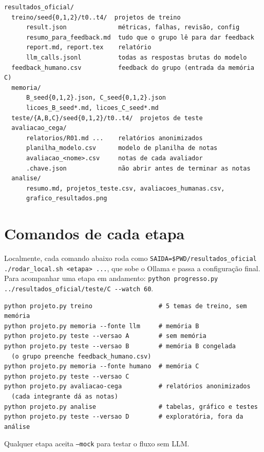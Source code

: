 \documentclass[11pt,a4paper]{article}
\begin{document}
\begin{verbatim}
resultados_oficial/
  treino/seed{0,1,2}/t0..t4/  projetos de treino
      result.json              métricas, falhas, revisão, config
      resumo_para_feedback.md  tudo que o grupo lê para dar feedback
      report.md, report.tex    relatório
      llm_calls.jsonl          todas as respostas brutas do modelo
  feedback_humano.csv          feedback do grupo (entrada da memória C)
  memoria/
      B_seed{0,1,2}.json, C_seed{0,1,2}.json
      licoes_B_seed*.md, licoes_C_seed*.md
  teste/{A,B,C}/seed{0,1,2}/t0..t4/  projetos de teste
  avaliacao_cega/
      relatorios/R01.md ...    relatórios anonimizados
      planilha_modelo.csv      modelo de planilha de notas
      avaliacao_<nome>.csv     notas de cada avaliador
      .chave.json              não abrir antes de terminar as notas
  analise/
      resumo.md, projetos_teste.csv, avaliacoes_humanas.csv,
      grafico_resultados.png
\end{verbatim}

\section{Comandos de cada etapa}

Localmente, cada comando abaixo roda como
\verb|SAIDA=$PWD/resultados_oficial ./rodar_local.sh <etapa> ...|, que sobe o Ollama
e passa a configuração final. Para acompanhar uma etapa em andamento:
\verb|python progresso.py ../resultados_oficial/teste/C --watch 60|.

\begin{verbatim}
python projeto.py treino                  # 5 temas de treino, sem memória
python projeto.py memoria --fonte llm     # memória B
python projeto.py teste --versao A        # sem memória
python projeto.py teste --versao B        # memória B congelada
  (o grupo preenche feedback_humano.csv)
python projeto.py memoria --fonte humano  # memória C
python projeto.py teste --versao C
python projeto.py avaliacao-cega          # relatórios anonimizados
  (cada integrante dá as notas)
python projeto.py analise                 # tabelas, gráfico e testes
python projeto.py teste --versao D        # exploratória, fora da análise
\end{verbatim}

Qualquer etapa aceita \texttt{--mock} para testar o fluxo sem LLM.
\end{document}
